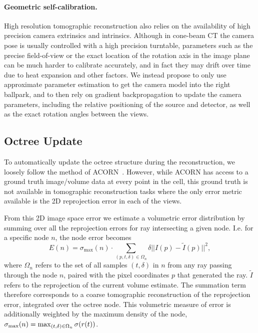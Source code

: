 \documentclass[acmtog,nonacm]{acmart} \acmSubmissionID{0438}
\newcommand{\vvec}[1]{\mathbf{#1}}   \newcommand{\mmat}[1]{\mathbf{\uppercase{#1}}}
\newcommand{\err}{E}
\newcommand{\img}{I}          \newcommand{\bgimg}{\img_0}   \newcommand{\oimg}{\hat\img}  \newcommand{\obgimg}{\hat\img_0}  \newcommand{\pix}{p}
\newcommand{\density}{\sigma} \newcommand{\mlp}{\Phi}
\newcommand{\ttt}{t}          \newcommand{\ts}{{t_n}}       \newcommand{\te}{{t_f}}       \newcommand{\x}{\vvec{x}}     \newcommand{\feat}{f}
\begin{document}
\paragraph*{Geometric self-calibration.}
High resolution tomographic reconstruction also relies on the
availability of high precision camera extrinsics and
intrinsics. Although in cone-beam CT the camera pose is usually
controlled with a high precision turntable, parameters such as the
precise field-of-view or the exact location of the rotation axis in
the image plane can be much harder to calibrate accurately, and in
fact they may drift over time due to heat expansion and other
factors. We instead propose to only use approximate parameter
estimation to get the camera model into the right ballpark, and to
then rely on gradient backpropagation to update the camera parameters,
including the relative positioning of the source and detector, as well
as the exact rotation angles between the views.



\subsection{Octree Update}
\label{sec:octree_update}
To automatically update the octree structure during the
reconstruction, we loosely follow the method of
ACORN~\cite{martel2021acorn}. However, while ACORN has access to a ground
truth image/volume data at every point in the cell, this ground truth
is not available in tomographic reconstruction tasks where the only
error metric available is the 2D reprojection error in each of the
views.

From this 2D image space error we estimate a volumetric error
distribution by summing over all the reprojection errors for ray
intersecting a given node. I.e. for a specific node $n$, the node
error becomes
\begin{equation}
  \err(n) = \density_{\max}(n) \cdot \sum_{(\pix,\ttt,\delta)\in\Omega_n} \delta || \img(\pix) - \tilde\img(\pix) ||^2,
\label{eq:node_error}
\end{equation}
where $\Omega_n$ refers to the set of all samples $(\ttt,\delta)$ in
$n$ from any ray passing through the node $n$, paired with the pixel
coordinates $\pix$ that generated the ray.  $\tilde\img$ refers to the
reprojection of the current volume estimate.  The summation term
therefore corresponds to a coarse tomographic reconstruction of the
reprojection error, integrated over the octree node. This volumetric
measure of error is additionally weighted by the maximum density of
the node, $\density_{\max}(n) =
\max_{(\ttt,\delta)\in\Omega_n}\density(\ray(\ttt))$.
\end{document}
